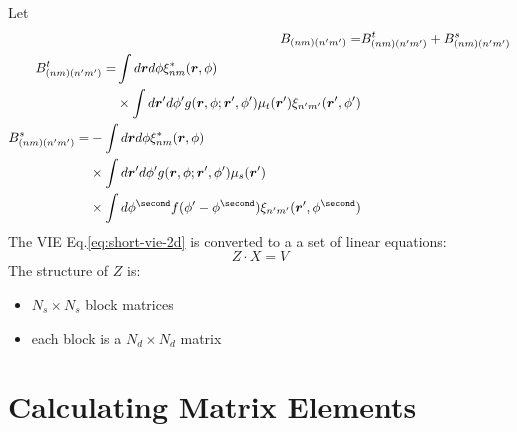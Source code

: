 \documentclass [10pt,letterpaper]{article}
\renewcommand{\vec}{\vectorsym}
\begin{document}
Let
\begin{subequations} \label{eq:def-B-Bt-Bs}
\begin{align}
	B_{(n m)(n^\prime m^\prime)}
	=& 
	B^t_{(n m)(n^\prime m^\prime)}
	+B^s_{(n m)(n^\prime m^\prime)}
	\\
	\begin{split}
		B^t_{(n m)(n^\prime m^\prime)}
		=&
		\int d\vec{r}d\phi
		\xi^*_{n m}(\vec{r},\phi)
		\\
		&\times
		\int d\vec{r}^\prime d\phi^\prime
		g(\vec{r},\phi;\vec{r}^\prime,\phi^\prime)
		\mu_t(\vec{r}^\prime)
		\xi_{n^\prime m^\prime}
		(\vec{r}^\prime,\phi^\prime)
	\end{split}
	\\
	\begin{split}
		B^s_{(n m)(n^\prime m^\prime)}
		=&
		-\int d\vec{r}d\phi
		\xi^*_{n m}(\vec{r},\phi)
		\\
		&\times
		\int d\vec{r}^\prime d\phi^\prime
		g(\vec{r},\phi;\vec{r}^\prime,\phi^\prime)
		\mu_s(\vec{r}^\prime)
		\\
		&\times
		\int d\phi^\second
		f(\phi^\prime-\phi^\second)
		\xi_{n^\prime m^\prime}
		(\vec{r}^\prime,\phi^\second) 
	\end{split}
\end{align}
\end{subequations}
The VIE Eq.\eqref{eq:short-vie-2d} is converted to a a set of linear equations:
\begin{equation} \label{eq:Z-X-V}
	Z\cdot X=V
\end{equation}
The structure of $Z$ is:
\begin{itemize}
	\item $N_s\times N_s$ block matrices
	\item each block is a $N_d\times N_d$ matrix
\end{itemize}




\section{Calculating Matrix Elements}
\label{sec:calculate-matrix-elements}
\end{document}
